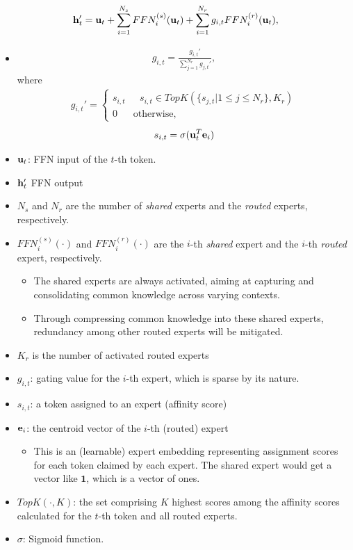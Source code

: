\begin{align*}
	{\mathbf{h}}_t' = {\mathbf{u}}_t+\sum^{N_s}_{i=1}FFN_i^{(s)}({\mathbf{u}}_t)+\sum^{N_r}_{i=1}g_{i,t}FFN_i^{(r)}({\mathbf{u}}_t),
\end{align*}
\begin{itemize}
	\item 
		\begin{align*}
			g_{i,t} = \frac{g_{i,t}'}{\sum^{N_r}_{j=1}g_{j,t}'},
		\end{align*}
		where
		\begin{align*}
			g_{i,t}' = \begin{cases}
				s_{i,t}&\text{ } s_{i,t}\in TopK(\{s_{j,t}|1\leq j \leq N_r\}, K_r)\\
				0&\text{otherwise,}
			\end{cases}
		\end{align*}
		$$s_{i,t} = \sigma({\mathbf{u}}_t^T{\mathbf{e}}_i)$$
	\item ${\mathbf{u}}_t$: FFN input of the $t$-th token. 
	\item ${\mathbf{h}}_t'$ FFN output
	\item $N_s$ and $N_r$ are the number of \textit{shared} experts and the \textit{routed} experts, respectively.
	\item $FFN_i^{(s)}(\cdot)$ and $FFN_i^{(r)}(\cdot)$ are the $i$-th \textit{shared} expert and the $i$-th \textit{routed} expert, respectively.
		\begin{itemize}
			\item The shared experts are always activated, aiming at capturing and consolidating common knowledge across varying contexts. 
			\item Through compressing common knowledge into these shared experts, redundancy among other routed experts will be mitigated.
		\end{itemize}
	\item $K_r$ is the number of activated routed experts
	\item $g_{i,t}$: gating value for the $i$-th expert, which is sparse by its nature. 
	\item $s_{i,t}$: a token assigned to an expert (\ie affinity score)
	\item ${\mathbf{e}}_i$: the centroid vector of the $i$-th (routed) expert 
		\begin{itemize}
			\item This is an (learnable) expert embedding representing assignment scores for each token claimed by each expert. The shared expert would get a vector like $\mathbf{1}$, which is a vector of ones.
		\end{itemize}
	\item $TopK(\cdot, K)$: the set comprising $K$ highest scores among the affinity scores calculated for the $t$-th token and all routed experts.
	\item $\sigma$: Sigmoid function.
\end{itemize}

